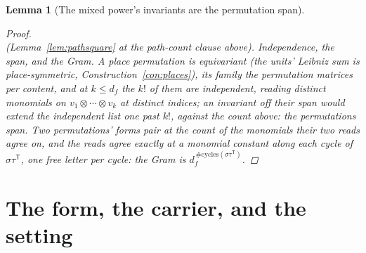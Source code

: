 \documentclass[11pt]{article}
\newtheorem{lemma}{Lemma}
\theoremstyle{definition}
\begin{document}
\begin{lemma}[The mixed power's invariants are the permutation span]
\begin{proof}
\[\]
(Lemma~\ref{lem:pathsquare} at the path-count clause above).
\emph{Independence, the span, and the Gram.} A place permutation is
equivariant (the units' Leibniz sum is place-symmetric,
Construction~\ref{con:places}), its family the permutation matrices
per content, and at $k\le d_f$ the $k!$ of them are independent,
reading distinct monomials on $v_1\otimes\cdots\otimes v_k$ at
distinct indices; an invariant off their span would extend the
independent list one past $k!$, against the count above: the
permutations span. Two permutations' forms pair at the count of the
monomials their two reads agree on, and the reads agree exactly at
a monomial constant along each cycle of $\sigma\tau^{\mathsf T}$,
one free letter per cycle: the Gram is
$d_f^{\,\#\mathrm{cycles}(\sigma\tau^{\mathsf T})}$.
\end{proof}
\end{lemma}

\section{The form, the carrier, and the setting}
\end{document}
